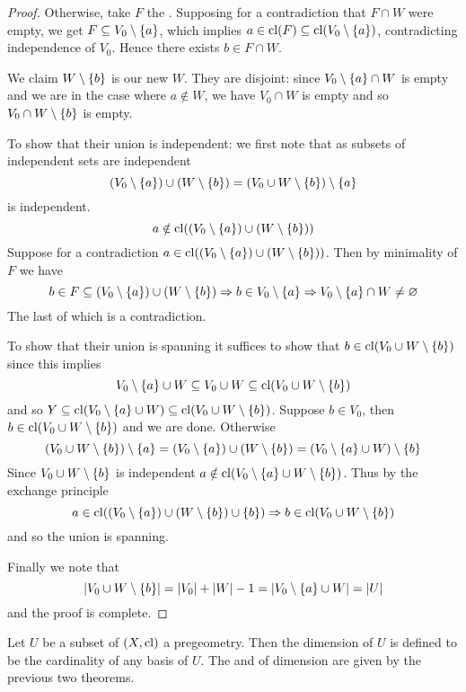 \begin{proof}
    Otherwise, take $F$ the 
    .
    Supposing for a contradiction that $F \cap W$ were empty,
    we get $F \subseteq V_0 \setminus \left\{a\right\}$, which implies 
    $a \in \operatorname{cl}(F) \subseteq \operatorname{cl}(V_0 \setminus \left\{a\right\})$, 
    contradicting independence of $V_0$.
    Hence there exists $b \in F \cap W$.

    We claim $W \setminus \left\{b\right\}$ is our new $W$.
    They are disjoint: since $V_0 \setminus \left\{a\right\} \cap W$ is empty 
    and we are in the case where $a \notin W$, we have $V_0 \cap W$ is empty
    and so $V_0 \cap W \setminus \left\{b\right\}$ is empty.

    To show that their union is independent:
    we first note that as subsets of independent sets are independent
    \[(V_0 \setminus \left\{a\right\}) \cup (W \setminus \left\{b\right\})
    = (V_0 \cup W \setminus \left\{b\right\}) \setminus \left\{a\right\}\]
    is independent.
    \[a \notin \operatorname{cl}((V_0 \setminus \left\{a\right\}) \cup (W \setminus \left\{b\right\}))\]
    Suppose for a contradiction 
    $a \in \operatorname{cl}((V_0 \setminus \left\{a\right\}) \cup (W \setminus \left\{b\right\}))$.
    Then by minimality of $F$ we have 
    \[
        b \in F \subseteq (V_0 \setminus \left\{a\right\}) \cup (W \setminus \left\{b\right\})
        \Rightarrow 
        b \in V_0 \setminus \left\{a\right\}
        \Rightarrow
        V_0 \setminus \left\{a\right\} \cap W \ne \varnothing
    \]
    The last of which is a contradiction.

    To show that their union is spanning it suffices to show that 
    $b \in \operatorname{cl}(V_0 \cup W \setminus \left\{b\right\})$ since this implies 
    \[V_0 \setminus \left\{a\right\} \cup W \subseteq V_0 \cup W 
    \subseteq \operatorname{cl}(V_0 \cup W \setminus \left\{b\right\})\]
    and so $Y \subseteq \operatorname{cl}(V_0 \setminus \left\{a\right\} \cup W)
    \subseteq \operatorname{cl}(V_0 \cup W \setminus \left\{b\right\})$.
    Suppose $b \in V_0$, 
    then $b \in \operatorname{cl}(V_0 \cup W \setminus \left\{b\right\})$ and we are done.
    Otherwise 
    \[
        (V_0 \cup W  \setminus \left\{b\right\}) \setminus \left\{a\right\} =
        (V_0 \setminus \left\{a\right\}) \cup (W \setminus \left\{b\right\}) = 
        (V_0 \setminus \left\{a\right\} \cup W) \setminus \left\{b\right\}
    \]
    Since $V_0 \cup W \setminus \left\{b\right\}$ is independent
    $a \notin \operatorname{cl}(V_0 \setminus \left\{a\right\} \cup W \setminus \left\{b\right\})$. 
    Thus by the exchange principle
    \[a \in \operatorname{cl}((V_0 \setminus \left\{a\right\}) \cup (W \setminus \left\{b\right\}) \cup \left\{b\right\}) 
    \Rightarrow 
    b \in \operatorname{cl}(V_0 \cup W \setminus \left\{b\right\})\]
    and so the union is spanning.

    Finally we note that 
    \[\left\vert V_0 \cup W \setminus \left\{b\right\} \right\vert = \left\vert V_0 \right\vert + \left\vert W \right\vert - 1 = 
    \left\vert V_0 \setminus \left\{a\right\} \cup W \right\vert = \left\vert U \right\vert\]
    and the proof is complete.
\end{proof}

\begin{dfn}[Dimension]
    Let $U$ be a subset of $(X,\operatorname{cl})$ a pregeometry.
    Then the dimension of $U$ is defined to be the cardinality of any basis of 
    $U$.
    The  and 
    of dimension are given by the previous two theorems.
\end{dfn}